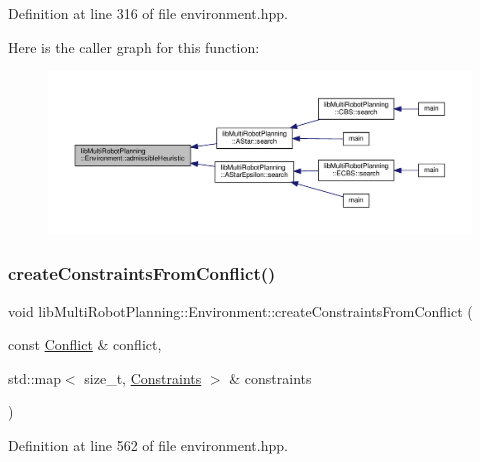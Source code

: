 Definition at line 316 of file environment.\+hpp.

Here is the caller graph for this function\+:
\nopagebreak
\begin{figure}[H]
\begin{center}
\leavevmode
\includegraphics[width=350pt]{classlib_multi_robot_planning_1_1_environment_a125ea447e414ab365fea0eead52e47d7_icgraph}
\end{center}
\end{figure}
\mbox{\label{classlib_multi_robot_planning_1_1_environment_a34aca235da8a5a1389ec71507c4191af}} 
\subsubsection{\texorpdfstring{create\+Constraints\+From\+Conflict()}{createConstraintsFromConflict()}}
{\footnotesize\ttfamily void lib\+Multi\+Robot\+Planning\+::\+Environment\+::create\+Constraints\+From\+Conflict (\begin{DoxyParamCaption}\item[{const \hyperlink{structlib_multi_robot_planning_1_1_conflict}{Conflict} \&}]{conflict,  }\item[{std\+::map$<$ size\+\_\+t, \hyperlink{structlib_multi_robot_planning_1_1_constraints}{Constraints} $>$ \&}]{constraints }\end{DoxyParamCaption})\hspace{0.3cm}{\ttfamily [inline]}}



Definition at line 562 of file environment.\+hpp.

